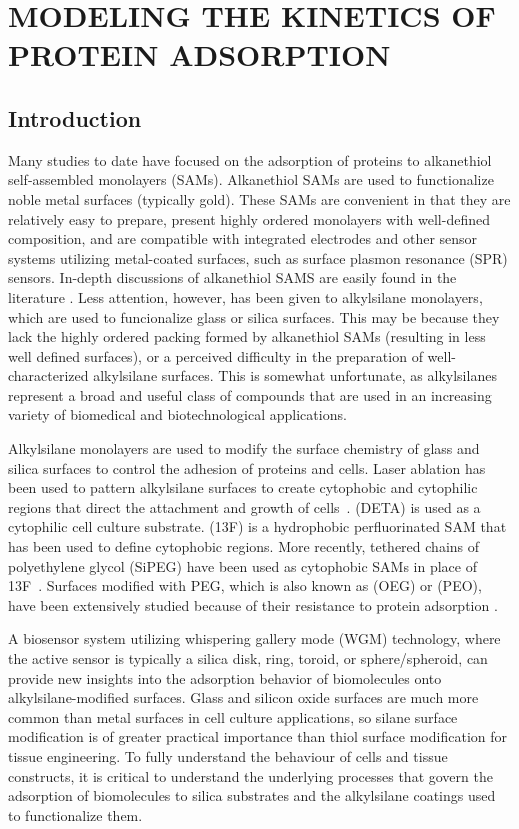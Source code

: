 
\chapter{MODELING THE KINETICS OF PROTEIN ADSORPTION}


\section{Introduction}

Many studies to date have focused on the adsorption of proteins to
alkanethiol self-assembled monolayers (SAMs). Alkanethiol SAMs are
used to functionalize noble metal surfaces (typically gold). These
SAMs are convenient in that they are relatively easy to prepare, present
highly ordered monolayers with well-defined composition, and are compatible
with integrated electrodes and other sensor systems utilizing metal-coated
surfaces, such as surface plasmon resonance (SPR) sensors. In-depth
discussions of alkanethiol SAMS are easily found in the literature
\cite{Love2005}. Less attention, however, has been given to alkylsilane
monolayers, which are used to funcionalize glass or silica surfaces.
This may be because they lack the highly ordered packing formed by
alkanethiol SAMs (resulting in less well defined surfaces), or a perceived
difficulty in the preparation of well-characterized alkylsilane surfaces.
This is somewhat unfortunate, as alkylsilanes represent a broad and
useful class of compounds that are used in an increasing variety of
biomedical and biotechnological applications. 

Alkylsilane monolayers are used to modify the surface chemistry of
glass and silica surfaces to control the adhesion of proteins and
cells. Laser ablation has been used to pattern alkylsilane surfaces
to create cytophobic and cytophilic regions that direct the attachment
and growth of cells~\cite{Stenger1992}. 
(DETA) is used as a cytophilic cell culture substrate. 
(13F) is a hydrophobic perfluorinated SAM that has been used to define
cytophobic regions. More recently, tethered chains of polyethylene
glycol (SiPEG) have been used as cytophobic SAMs in place of 13F~\cite{Wilson2011a}.
Surfaces modified with PEG, which is also known as 
(OEG) or  (PEO), have been extensively
studied because of their resistance to protein adsorption \cite{Gombotz1991}.

A biosensor system utilizing whispering gallery mode (WGM) technology,
where the active sensor is typically a silica disk, ring, toroid,
or sphere/spheroid, can provide new insights into the adsorption behavior
of biomolecules onto alkylsilane-modified surfaces. Glass and silicon
oxide surfaces are much more common than metal surfaces in cell culture
applications, so silane surface modification is of greater practical
importance than thiol surface modification for tissue engineering.
To fully understand the behaviour of cells and tissue constructs,
it is critical to understand the underlying processes that govern
the adsorption of biomolecules to silica substrates and the alkylsilane
coatings used to functionalize them.


